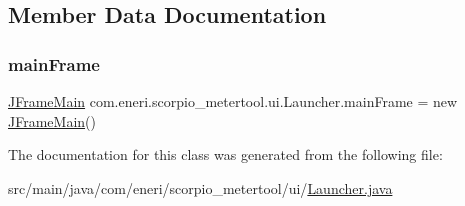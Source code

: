\subsection{Member Data Documentation}
\mbox{\label{classcom_1_1eneri_1_1scorpio__metertool_1_1ui_1_1_launcher_a0fa4290667c7cb8b5491f47d7e8542c6}} 
\subsubsection{\texorpdfstring{main\+Frame}{mainFrame}}
{\footnotesize\ttfamily \hyperlink{classcom_1_1eneri_1_1scorpio__metertool_1_1ui_1_1_j_frame_main}{J\+Frame\+Main} com.\+eneri.\+scorpio\+\_\+metertool.\+ui.\+Launcher.\+main\+Frame = new \hyperlink{classcom_1_1eneri_1_1scorpio__metertool_1_1ui_1_1_j_frame_main}{J\+Frame\+Main}()\hspace{0.3cm}{\ttfamily [static]}}



The documentation for this class was generated from the following file\+:\begin{DoxyCompactItemize}
\item 
src/main/java/com/eneri/scorpio\+\_\+metertool/ui/\hyperlink{_launcher_8java}{Launcher.\+java}\end{DoxyCompactItemize}
